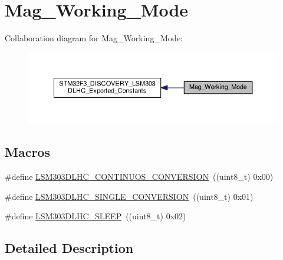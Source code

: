\hypertarget{group__Mag__Working__Mode}{\section{Mag\+\_\+\+Working\+\_\+\+Mode}
\label{group__Mag__Working__Mode}
}
Collaboration diagram for Mag\+\_\+\+Working\+\_\+\+Mode\+:\nopagebreak
\begin{figure}[H]
\begin{center}
\leavevmode
\includegraphics[width=350pt]{group__Mag__Working__Mode}
\end{center}
\end{figure}
\subsection*{Macros}
\begin{DoxyCompactItemize}
\item 
\#define \hyperlink{group__Mag__Working__Mode_gafda925d9affd406dcff329602ef406be}{L\+S\+M303\+D\+L\+H\+C\+\_\+\+C\+O\+N\+T\+I\+N\+U\+O\+S\+\_\+\+C\+O\+N\+V\+E\+R\+S\+I\+O\+N}~((uint8\+\_\+t) 0x00)
\item 
\#define \hyperlink{group__Mag__Working__Mode_gadc9734508e2ead31b94948d08cc684b8}{L\+S\+M303\+D\+L\+H\+C\+\_\+\+S\+I\+N\+G\+L\+E\+\_\+\+C\+O\+N\+V\+E\+R\+S\+I\+O\+N}~((uint8\+\_\+t) 0x01)
\item 
\#define \hyperlink{group__Mag__Working__Mode_gaa893038c7e3b6343b2a3378a561906da}{L\+S\+M303\+D\+L\+H\+C\+\_\+\+S\+L\+E\+E\+P}~((uint8\+\_\+t) 0x02)
\end{DoxyCompactItemize}


\subsection{Detailed Description}


